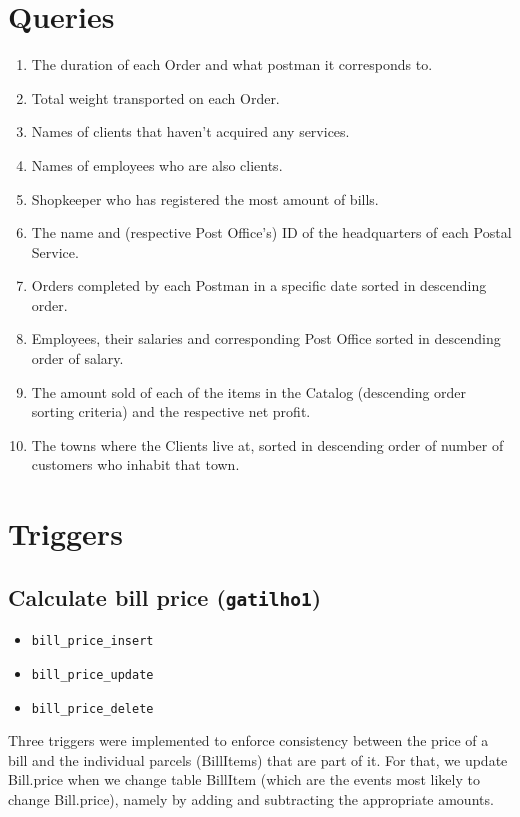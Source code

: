 \documentclass{report}[a4paper]
\theoremstyle{remark}
\begin{document}
\chapter{Queries}

\begin{enumerate}
    \item The duration of each Order and what postman it corresponds to.
    \item Total weight transported on each Order.
    \item Names of clients that haven't acquired any services.
    \item Names of employees who are also clients.
    \item Shopkeeper who has registered the most amount of bills.
    \item The name and (respective Post Office's) ID of the headquarters of each Postal Service.
    \item Orders completed by each Postman in a specific date sorted in descending order.
    \item Employees, their salaries and corresponding Post Office sorted in descending order of salary.
    \item The amount sold of each of the items in the Catalog (descending order sorting criteria) and the respective net profit.
    \item The towns where the Clients live at, sorted in descending order of number of customers who inhabit that town.
\end{enumerate}

\chapter{Triggers}
\section{Calculate bill price (\texttt{gatilho1})}
\begin{itemize}
    \item \texttt{bill\_price\_insert}
    \item \texttt{bill\_price\_update}
    \item \texttt{bill\_price\_delete}
\end{itemize}
Three triggers were implemented to enforce consistency between the price of a bill and the individual parcels (BillItems) that are part of it. For that, we update Bill.price when we change table BillItem (which are the events most likely to change Bill.price), namely by adding and subtracting the appropriate amounts.
\end{document}
